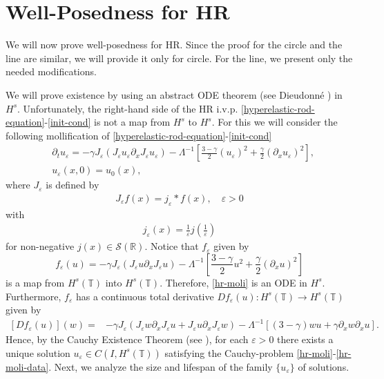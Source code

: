 \documentclass[12pt,reqno]{amsart}
\newcommand{\rr}{\mathbb{R}}
\newcommand{\p}{\partial}
\newcommand{\ci}{\mathbb{T}}
\newcommand{\ee}{\varepsilon}
\theoremstyle{plain}  %
\theoremstyle{definition}
\begin{document}
\section{Well-Posedness for HR}
\label{sec:4}
\setcounter{equation}{0}
%
%
%
%
%
We will now prove well-posedness for HR.
Since the proof for the circle and the line are similar,
we will provide it only for circle.
For the line, we present only the
needed modifications.
%
%
%
%
%

We will prove existence by using an abstract ODE theorem (see Dieudonn\'e 
\cite{Dieudonne_1969_Foundations-of-}) in $H^s$. 
Unfortunately, the 
right-hand side of the HR i.v.p. \eqref{hyperelastic-rod-equation}-\eqref{init-cond}
is not a map from $H^s$ to $H^s$.
For this we will consider the following mollification of 
\eqref{hyperelastic-rod-equation}-\eqref{init-cond}
%
%
\begin{align}
\label{hr-moli}
& \p_t  u_\ee =
-\gamma J_\ee(J_\ee u_\ee \partial_x  J_\ee  u_\ee) - \Lambda^{-1} \left 
[\frac{3-\gamma}{2}(u_\ee)^2 + \frac{\gamma}{2}(\p_x u_\ee)^2 \right ],
\\
& u_\ee(x, 0) = u_0 (x),
\label{hr-moli-data}
\end{align}
%
% 
%
%
%
%
%
%
where $J_\ee$ is defined  by
%
\begin{equation*}
\begin{split}
J_\ee f(x) = j_\ee * f(x), \quad \ee>0
\end{split}
\end{equation*}
%
with 
%
\begin{equation*}
\begin{split}
j_\ee(x) = \frac{1}{\ee}j\left( \frac{1}{\ee} \right)
\end{split}
\end{equation*}
%
for non-negative $j(x) \in
\mathcal{S}(\rr)$. Notice that  $f_\ee$ given by 
%
%
\begin{equation*}
\label{f_ep}
f_{\ee}(u) = - \gamma J_\ee(J_\varepsilon u \partial_x J_\varepsilon u)
- \Lambda^{-1} \left
[\frac{3-\gamma}{2}u^2 + \frac{\gamma}{2}(\p_x u)^2 \right ]
\end{equation*}
%
is a map from $H^s(\ci)$  into $H^s(\ci)$. 
Therefore, \eqref{hr-moli}
is an ODE in $H^s$.
%
%
Furthermore, $f_\ee$ has a continuous total derivative $D f_\ee (u): 
H^s(\ci) \to H^s(\ci)$ given by
\begin{equation*}
	\label{total-deriv}
	\begin{split}
		[Df_{\ee}(u)](w)
		=
		& -\gamma J_\ee (J_\varepsilon w \partial_x J_\varepsilon u +
		J_\varepsilon u \partial_x J_\varepsilon w)
		- \Lambda^{-1} \left [(3-\gamma)w u + \gamma\p_x w \p_x u \right ].
	\end{split}
\end{equation*}
Hence, by the Cauchy Existence Theorem (see \cite{Dieudonne_1969_Foundations-of-}), for each 
$\ee > 0$ there exists a
unique solution $u_\ee \in C(I, H^s(\ci))$ satisfying the Cauchy-problem
\eqref{hr-moli}-\eqref{hr-moli-data}. Next, we analyze the size and
lifespan of the family $\{u_\ee\}$ of solutions.
%
%
%
%
\end{document}

